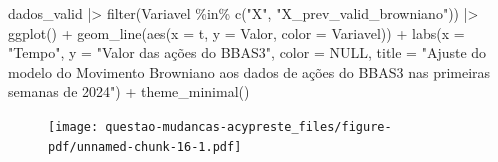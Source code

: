 \documentclass[
  letterpaper,
  DIV=11,
  numbers=noendperiod]{scrreprt}
\newenvironment{Shaded}{\begin{snugshade}}{\end{snugshade}}
\newcommand{\AttributeTok}[1]{\textcolor[rgb]{0.40,0.45,0.13}{#1}}
\newcommand{\ConstantTok}[1]{\textcolor[rgb]{0.56,0.35,0.01}{#1}}
\newcommand{\FunctionTok}[1]{\textcolor[rgb]{0.28,0.35,0.67}{#1}}
\newcommand{\NormalTok}[1]{\textcolor[rgb]{0.00,0.23,0.31}{#1}}
\newcommand{\SpecialCharTok}[1]{\textcolor[rgb]{0.37,0.37,0.37}{#1}}
\newcommand{\StringTok}[1]{\textcolor[rgb]{0.13,0.47,0.30}{#1}}
\begin{document}
\begin{Shaded}
\begin{Highlighting}[]
\NormalTok{dados\_valid }\SpecialCharTok{|\textgreater{}}
    \FunctionTok{filter}\NormalTok{(Variavel }\SpecialCharTok{\%in\%} \FunctionTok{c}\NormalTok{(}\StringTok{"X"}\NormalTok{, }\StringTok{"X\_prev\_valid\_browniano"}\NormalTok{)) }\SpecialCharTok{|\textgreater{}}
    \FunctionTok{ggplot}\NormalTok{() }\SpecialCharTok{+}
    \FunctionTok{geom\_line}\NormalTok{(}\FunctionTok{aes}\NormalTok{(}\AttributeTok{x =}\NormalTok{ t, }\AttributeTok{y =}\NormalTok{ Valor, }\AttributeTok{color =}\NormalTok{ Variavel)) }\SpecialCharTok{+}
    \FunctionTok{labs}\NormalTok{(}\AttributeTok{x =} \StringTok{"Tempo"}\NormalTok{,}
         \AttributeTok{y =} \StringTok{"Valor das ações do BBAS3"}\NormalTok{,}
         \AttributeTok{color =} \ConstantTok{NULL}\NormalTok{,}
         \AttributeTok{title =} \StringTok{"Ajuste do modelo do Movimento Browniano aos dados}
\StringTok{          de ações do BBAS3 nas primeiras semanas de 2024"}\NormalTok{) }\SpecialCharTok{+}
    \FunctionTok{theme\_minimal}\NormalTok{()}
\end{Highlighting}
\end{Shaded}

\begin{figure}[H]

{\centering \texttt{[image: questao-mudancas-acypreste\_files/figure-pdf/unnamed-chunk-16-1.pdf]}

}

\end{figure}



\printindex
\end{document}
